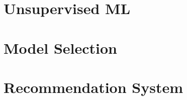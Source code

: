 \documentclass[11pt,fleqn]{book} %
\begin{document}
%

\part{Unsupervised ML}




%

\part{Model Selection}




%

\part{Recommendation System}



\end{document}
